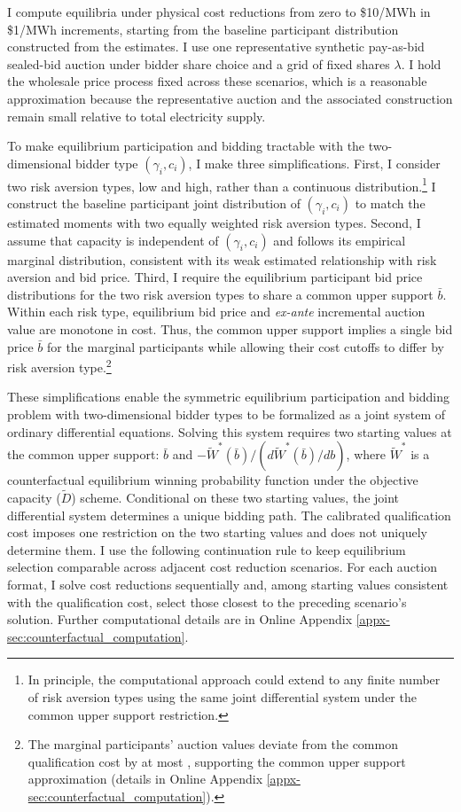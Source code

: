\documentclass[12pt]{article}
\theoremstyle{definition} %
\begin{document}
I compute equilibria under physical cost reductions from zero to \$10/MWh in \$1/MWh increments, starting from the baseline participant distribution constructed from the estimates. I use one representative synthetic pay-as-bid sealed-bid auction under bidder share choice and a grid of fixed shares $\lambda$. I hold the wholesale price process fixed across these scenarios, which is a reasonable approximation because the representative auction and the associated construction remain small relative to total electricity supply.

To make equilibrium participation and bidding tractable with the two-dimensional bidder type $(\gamma_i,c_i)$, I make three simplifications. First, I consider two risk aversion types, low and high, rather than a continuous distribution.\footnote{
In principle, the computational approach could extend to any finite number of risk aversion types using the same joint differential system under the common upper support restriction.
} I construct the baseline participant joint distribution of $(\gamma_i,c_i)$ to match the estimated moments with two equally weighted risk aversion types. Second, I assume that capacity is independent of $(\gamma_i,c_i)$ and follows its empirical marginal distribution, consistent with its weak estimated relationship with risk aversion and bid price. Third, I require the equilibrium participant bid price distributions for the two risk aversion types to share a common upper support $\bar b$. Within each risk type, equilibrium bid price and \emph{ex-ante} incremental auction value are monotone in cost. Thus, the common upper support implies a single bid price $\bar b$ for the marginal participants while allowing their cost cutoffs to differ by risk aversion type.\footnote{
The marginal participants' auction values deviate from the common qualification cost by at most , supporting the common upper support approximation (details in Online Appendix \ref{appx-sec:counterfactual_computation}).
}

These simplifications enable the symmetric equilibrium participation and bidding problem with two-dimensional bidder types to be formalized as a joint system of ordinary differential equations. Solving this system requires two starting values at the common upper support: $\bar b$ and $-\widetilde W^\ast(\bar b)/(d\widetilde W^\ast(\bar b)/db) $, where \(\widetilde W^\ast\) is a counterfactual equilibrium winning probability function under the objective capacity ($\widetilde D$) scheme. Conditional on these two starting values, the joint differential system determines a unique bidding path. The calibrated qualification cost imposes one restriction on the two starting values and does not uniquely determine them. I use the following continuation rule to keep equilibrium selection comparable across adjacent cost reduction scenarios. For each auction format, I solve cost reductions sequentially and, among starting values consistent with the qualification cost, select those closest to the preceding scenario's solution. Further computational details are in Online Appendix \ref{appx-sec:counterfactual_computation}.
\end{document}
